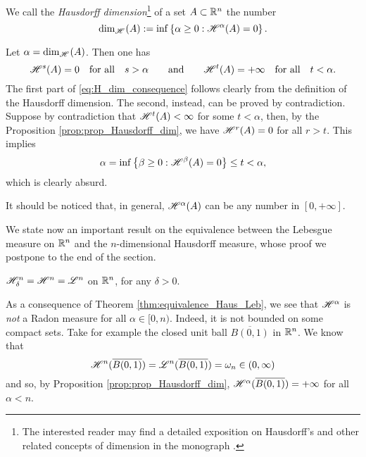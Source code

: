 \begin{definition}
We call the \emph{Hausdorff dimension}\footnote{The interested reader may find a detailed exposition on Hausdorff's and other related concepts of dimension in the monograph \cite{Falconer}.} of a set $A\subset \mathbb{R}^n$ the number
\[
{\rm dim}_{\mathscr{H}^{}}(A) := \inf\left\{ \alpha \geq 0 : \mathscr{H}^{\alpha}(A) = 0
\right\}.
\]
\end{definition}

\begin{remark}
Let $\alpha = {\rm dim}_{\mathscr{H}^{}}(A)$. Then one has
\begin{equation} \label{eq:H_dim_consequence}
\mathscr{H}^{s}(A) = 0 \quad \text{for all} \quad s > \alpha
\qquad \text{and} \qquad
\mathscr{H}^{t}(A) = +\infty \quad \text{for all} \quad t < \alpha.
\end{equation}
The first part of \eqref{eq:H_dim_consequence} follows clearly from the definition of the Hausdorff dimension. The second, instead, can be proved by contradiction. Suppose by contradiction that $\mathscr{H}^{t}(A) < \infty$ for some $t < \alpha$, then, by the Proposition \ref{prop:prop_Hausdorff_dim}, we have $\mathscr{H}^{r}(A) = 0$ for all $ r > t$. This implies 
$$\alpha = \inf\left\{ \beta \geq 0 : \mathscr{H}^{\beta}(A) = 0
\right\} \le t < \alpha,$$
which is clearly absurd.

It should be noticed that, in general, $\mathscr{H}^{\alpha}(A)$ can be any number in $[0, + \infty]$.
\end{remark}

We state now an important result on the equivalence between the Lebesgue measure on $\mathbb{R}^{n}$ and the $n$-dimensional Hausdorff measure, whose proof we postpone to the end of the section.

\begin{theorem} \label{thm:equivalence_Haus_Leb}
$\mathscr{H}^{n}_{\delta} = \mathscr{H}^{n} = \mathscr{L}^{n}$ on $\mathbb{R}^{n}$, for any $\delta > 0$.
\end{theorem}

\begin{remark}
As a consequence of Theorem \ref{thm:equivalence_Haus_Leb}, we see that $\mathscr{H}^{\alpha}$ is \emph{not} a Radon measure for all $\alpha \in
[0,n)$. Indeed, it is not bounded on some compact sets. Take for example the closed unit ball $\overline{B(0,1)}$ in $\mathbb{R}^n$. We know that 
\begin{equation*}
\mathscr{H}^{n}(\overline{B(0,1)}) = \mathscr{L}^{n}(\overline{B(0, 1)}) = \omega_{n} \in (0, \infty)
\end{equation*} 
and so, by Proposition \ref{prop:prop_Hausdorff_dim},
$\mathscr{H}^{\alpha}(\overline{B(0,1)}) = +\infty$ for all $\alpha < n$.
\end{remark}

